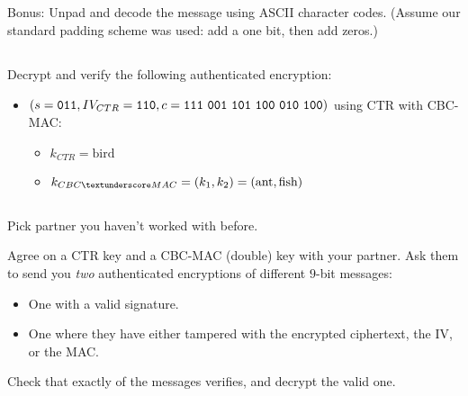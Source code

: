 \documentclass[12pt]{article}
\begin{document}
\subsection{}

Bonus: Unpad and decode the message using ASCII character codes. (Assume our standard padding scheme was used: add a one bit, then add zeros.)




\subsection{}

Decrypt and verify the following authenticated encryption:

\begin{itemize}
\item $(s = {\tt 011}, IV_{CTR} = {\tt 110}, c = {\tt 111~001~101~100~010~100})$ using CTR with CBC-MAC:
\begin{itemize}
\item $k_{CTR} = \text{bird}$
\item $k_{CBC{\textunderscore}MAC} = (k_1, k_2) = (\text{ant}, \text{fish})$ \\
\end{itemize}
\end{itemize}



\subsection{}

Pick  partner you haven't worked with before.

Agree on a CTR key and a CBC-MAC (double) key with your partner. Ask them to send you \emph{two} authenticated encryptions of different $9$-bit messages:

\begin{itemize}
\item One with a valid signature.
\item One where they have either tampered with the encrypted ciphertext, the IV, or the MAC.
\end{itemize}

Check that exactly of the messages verifies, and decrypt the valid one.
\end{document}
